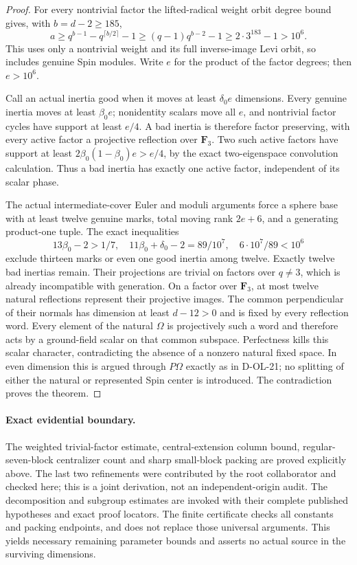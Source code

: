 \begin{proof}
For every nontrivial factor the lifted-radical weight
orbit degree bound gives, with $b=d-2\ge185$,
\[
 a\ge q^{b-1}-q^{\lceil b/2\rceil}-1
      \ge(q-1)q^{b-2}-1
      \ge2\cdot3^{183}-1>10^6.
 \tag{SPO.19}
\]
This uses only a nontrivial weight and its full inverse-image
Levi orbit, so includes genuine Spin modules.
Write $e$ for the product of the factor degrees; then $e>10^6$.

Call an actual inertia good when it moves at least
$\delta_0e$ dimensions.  Every genuine inertia moves
at least $\beta_0e$; nonidentity scalars move all $e$,
and nontrivial factor cycles have support at least $e/4$.
A bad inertia is therefore factor preserving, with
every active factor a projective reflection over $\mathbf F_3$.
Two such active factors have support at least
$2\beta_0(1-\beta_0)e>e/4$, by the exact two-eigenspace
convolution calculation.  Thus a bad inertia has exactly
one active factor, independent of its scalar phase.

The actual intermediate-cover Euler and moduli arguments
force a sphere base with at least twelve genuine marks,
total moving rank $2e+6$, and a generating product-one tuple.
The exact inequalities
\[
 13\beta_0-2>1/7,\quad
 11\beta_0+\delta_0-2=89/10^7,\quad
 6\cdot10^7/89<10^6
 \tag{SPO.20}
\]
exclude thirteen marks or even one good inertia among twelve.
Exactly twelve bad inertias remain.
Their projections are trivial on factors over $q\ne3$,
which is already incompatible with generation.
On a factor over $\mathbf F_3$, at most twelve natural
reflections represent their projective images.
The common perpendicular of their normals has dimension
at least $d-12>0$ and is fixed by every reflection word.
Every element of the natural $\Omega$ is projectively
such a word and therefore acts by a ground-field scalar
on that common subspace.  Perfectness kills this scalar
character, contradicting the absence of a nonzero natural
fixed space.  In even dimension this is argued through
$P\Omega$ exactly as in D-OL-21; no splitting of either
the natural or represented Spin center is introduced.
The contradiction proves the theorem.
\end{proof}

\paragraph{Exact evidential boundary.}
The weighted trivial-factor estimate, central-extension column
bound, regular-seven-block centralizer count and sharp small-block
packing are proved explicitly above.  The last two refinements
were contributed by the root collaborator and checked here; this
is a joint derivation, not an independent-origin audit.
The decomposition and subgroup estimates are invoked with
their complete published hypotheses and exact proof locators.
The finite certificate checks all constants and packing
endpoints, and does not replace those universal arguments.
This yields necessary remaining parameter bounds and
asserts no actual source in the surviving dimensions.
